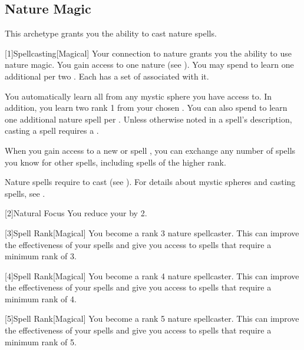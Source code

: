     \subsection{Nature Magic}
        This archetype grants you the ability to cast nature spells.

        [1]{Spellcasting}[Magical]
        Your connection to nature grants you the ability to use nature magic.
        You gain access to one nature  (see ).
        You may spend  to learn one additional  per two .
        Each  has a set of  associated with it.

        You automatically learn all  from any mystic sphere you have access to.
        In addition, you learn two rank 1  from your chosen .
        You can also spend  to learn one additional nature spell per .
        Unless otherwise noted in a spell's description, casting a spell requires a .

        When you gain access to a new  or spell ,
            you can exchange any number of spells you know for other spells,
            including spells of the higher rank.

        Nature spells require  to cast (see ).
        For details about mystic spheres and casting spells, see .

        [2]{Natural Focus} You reduce your  by 2.

        [3]{Spell Rank}[Magical] You become a rank 3 nature spellcaster.
        This can improve the effectiveness of your spells and give you access to spells that require a minimum rank of 3.

        [4]{Spell Rank}[Magical] You become a rank 4 nature spellcaster.
        This can improve the effectiveness of your spells and give you access to spells that require a minimum rank of 4.

        [5]{Spell Rank}[Magical] You become a rank 5 nature spellcaster.
        This can improve the effectiveness of your spells and give you access to spells that require a minimum rank of 5.

